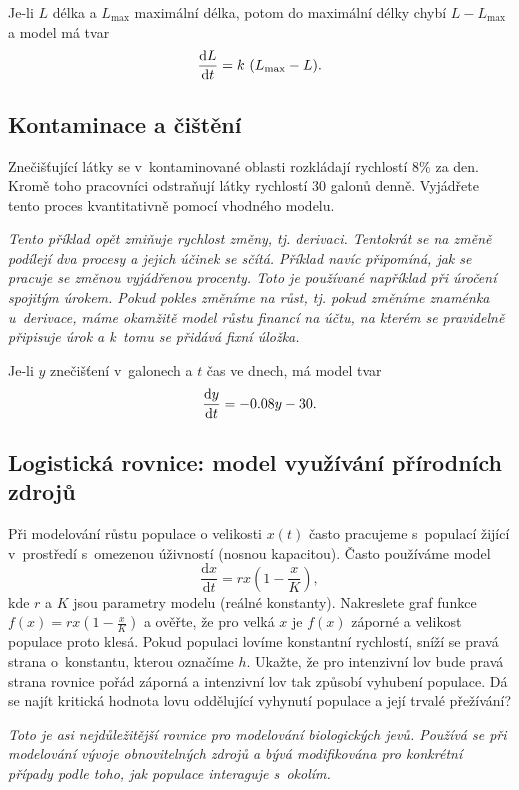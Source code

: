 \reseni
Je-li $L$ délka a $L_{\max}$ maximální délka, potom do maximální délky chybí  $L-L_{\max}$ a model má tvar
$$\derivace Lt=k (L_{\max}-L).$$
\konec

\subsection{Kontaminace a čištění}
Znečišťující látky se v kontaminované oblasti rozkládají rychlostí
$8\%$ za den. Kromě toho pracovníci odstraňují látky rychlostí $30$
galonů denně. Vyjádřete tento proces kvantitativně pomocí vhodného
modelu.

\textit{Tento příklad opět zmiňuje rychlost změny, tj. derivaci. Tentokrát se na změně podílejí dva procesy a jejich účinek se sčítá. Příklad navíc připomíná, jak se pracuje se změnou vyjádřenou procenty. Toto je používané například při úročení spojitým úrokem. Pokud pokles změníme na růst, tj. pokud změníme
  znaménka u derivace, máme okamžitě model růstu financí na účtu, na kterém se pravidelně připisuje úrok a k tomu se přidává fixní úložka.}

\reseni Je-li $y$ znečišťení v galonech a $t$ čas ve dnech, má model tvar
$$\frac{\mathrm{d}y}{\mathrm{d}t}=-0.08y-30.$$

\konec



\subsection{Logistická rovnice: model využívání přírodních zdrojů}
Při modelování růstu populace o velikosti $x(t)$ často pracujeme s populací žijící v prostředí s omezenou úživností (nosnou kapacitou). Často používáme model
$$\frac{\mathrm d x}{\mathrm dt}=rx\left(1-\frac xK\right),$$
kde $r$ a $K$ jsou parametry modelu (reálné konstanty).  Nakreslete
graf funkce $f(x)=rx\left(1-\frac xK\right)$ a ověřte, že pro velká
$x$ je $f(x)$ záporné a velikost populace proto klesá. Pokud populaci
lovíme konstantní rychlostí, sníží se pravá strana o konstantu, kterou
označíme $h$. Ukažte, že pro intenzivní lov bude pravá strana rovnice
pořád záporná a intenzivní lov tak způsobí vyhubení populace. Dá se
najít kritická hodnota lovu oddělující vyhynutí populace a její
trvalé přežívání?

\textit{Toto je asi nejdůležitější rovnice pro modelování biologických jevů. Používá se při modelování vývoje obnovitelných zdrojů a bývá modifikována pro konkrétní případy podle toho, jak populace interaguje s okolím.}

